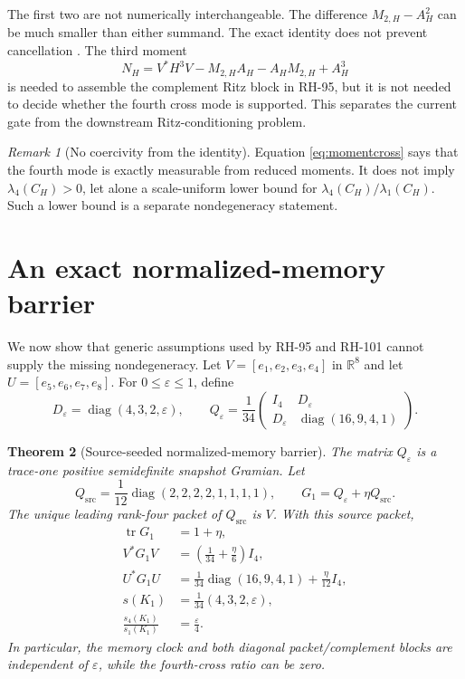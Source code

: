 \documentclass[11pt]{article}
\newtheorem{theorem}{Theorem}[section]
\theoremstyle{definition}
\theoremstyle{remark}
\newtheorem{remark}[theorem]{Remark}
\newcommand{\tr}{\operatorname{tr}}
\newcommand{\diag}{\operatorname{diag}}
\begin{document}
The first two are not numerically interchangeable.  The difference
$M_{2,H}-A_H^2$ can be much smaller than either summand.  The exact identity
does not prevent cancellation \citep{Higham2002}.  The third moment
\begin{equation}
 N_H=V^*H^3V-M_{2,H}A_H-A_HM_{2,H}+A_H^3
 \label{eq:thirdmoment}
\end{equation}
is needed to assemble the complement Ritz block in RH-95, but it is not
needed to decide whether the fourth cross mode is supported.  This separates
the current gate from the downstream Ritz-conditioning problem.

\begin{remark}[No coercivity from the identity]
Equation \eqref{eq:momentcross} says that the fourth mode is exactly
measurable from reduced moments.  It does not imply
$\lambda_4(C_H)>0$, let alone a scale-uniform lower bound for
$\lambda_4(C_H)/\lambda_1(C_H)$.  Such a lower bound is a separate
nondegeneracy statement.
\end{remark}

\section{An exact normalized-memory barrier}
\label{sec:barrier}

We now show that generic assumptions used by RH-95 and RH-101 cannot supply
the missing nondegeneracy.  Let $V=[e_1,e_2,e_3,e_4]$ in $\mathbb R^8$ and
let $U=[e_5,e_6,e_7,e_8]$.  For $0\le\varepsilon\le1$, define
\begin{equation}
 D_\varepsilon=\diag(4,3,2,\varepsilon),
 \qquad
 Q_\varepsilon=\frac1{34}
 \begin{pmatrix}
 I_4&D_\varepsilon\\
 D_\varepsilon&\diag(16,9,4,1)
 \end{pmatrix}.
 \label{eq:qbarrier}
\end{equation}

\begin{theorem}[Source-seeded normalized-memory barrier]
\label{thm:barrier}
The matrix $Q_\varepsilon$ is a trace-one positive semidefinite snapshot
Gramian.  Let
\begin{equation}
 Q_{\mathrm{src}}=\frac1{12}\diag(2,2,2,2,1,1,1,1),
 \qquad G_1=Q_\varepsilon+\eta Q_{\mathrm{src}}.
 \label{eq:barriermemory}
\end{equation}
The unique leading rank-four packet of $Q_{\mathrm{src}}$ is $V$.  With this source
packet,
\begin{align}
 \tr G_1&=1+\eta,
 \\
 V^*G_1V&=\left(\frac1{34}+\frac\eta6\right)I_4,
 \\
 U^*G_1U&=\frac1{34}\diag(16,9,4,1)+\frac\eta{12}I_4,
 \label{eq:barrierblocks}
 \\
 s(K_1)&=\frac1{34}(4,3,2,\varepsilon),
 \\
 \frac{s_4(K_1)}{s_1(K_1)}&=\frac\varepsilon4.
 \label{eq:barrierratio}
\end{align}
In particular, the memory clock and both diagonal packet/complement blocks
are independent of $\varepsilon$, while the fourth-cross ratio can be zero.
\end{theorem}
\end{document}
